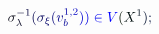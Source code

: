 \documentclass[12pt]{article}
\begin{document}
\makeatletter
\renewcommand*{\@textcolor}[3]{%
  \protect\leavevmode
  \begingroup
    \color#1{#2}#3%
  \endgroup
}
\makeatother
\begin{displaymath}
\mathcolor[RGB]{0,0,15}{\sigma} _ { \mathcolor[RGB]{0,0,30}{\lambda} } ^ { \mathcolor[RGB]{0,0,45}{-} \mathcolor[RGB]{0,0,60}{1} } \mathcolor[RGB]{0,0,75}{(} \mathcolor[RGB]{0,0,90}{\sigma} _ { \mathcolor[RGB]{0,0,105}{\xi} } \mathcolor[RGB]{0,0,120}{(} \mathcolor[RGB]{0,0,135}{v} _ { \mathcolor[RGB]{0,0,150}{b} } ^ { \mathcolor[RGB]{0,0,165}{1} \mathcolor[RGB]{0,0,180}{,} \mathcolor[RGB]{0,0,195}{2} } \mathcolor[RGB]{0,0,210}{)} \mathcolor[RGB]{0,0,225}{)} \mathcolor[RGB]{0,0,240}{\in} \mathcolor[RGB]{0,0,255}{V} \mathcolor[RGB]{0,15,0}{(} \mathcolor[RGB]{0,15,15}{X} ^ { \mathcolor[RGB]{0,15,30}{1} } \mathcolor[RGB]{0,15,45}{)} \mathcolor[RGB]{0,15,60}{;}
\end{displaymath}
\end{document}
